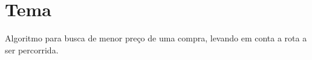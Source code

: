 
\section{Tema}
Algoritmo para busca de menor preço de uma compra, levando em conta a rota a ser percorrida.